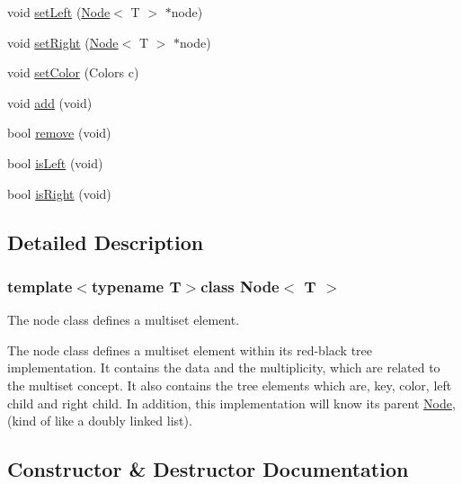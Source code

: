 \begin{DoxyCompactItemize}
\item 
void \hyperlink{class_node_a9afbeb2daea8798e71e9acc0967256a3}{set\+Left} (\hyperlink{class_node}{Node}$<$ T $>$ $\ast$node)
\item 
void \hyperlink{class_node_a1cf0e5397a347fee789c4b57dfb7624a}{set\+Right} (\hyperlink{class_node}{Node}$<$ T $>$ $\ast$node)
\item 
void \hyperlink{class_node_a96c1038d58f6f7089271afe3fa3e9288}{set\+Color} (Colors c)
\item 
void \hyperlink{class_node_aef85f7c8d30881449f35ac5fda836438}{add} (void)
\item 
bool \hyperlink{class_node_a2f77a48dceae8b8268826483f9671e1a}{remove} (void)
\item 
bool \hyperlink{class_node_a614f99e8df6aebb91c9e17e204a8c170}{is\+Left} (void)
\item 
bool \hyperlink{class_node_ac8eeb9f7717618589d939491d87a04bf}{is\+Right} (void)
\end{DoxyCompactItemize}


\subsection{Detailed Description}
\subsubsection*{template$<$typename T$>$class Node$<$ T $>$}

The node class defines a multiset element.

The node class defines a multiset element within it\textquotesingle{}s red-\/black tree implementation. It contains the data and the multiplicity, which are related to the multiset concept. It also contains the tree elements which are, key, color, left child and right child. In addition, this implementation will know it\textquotesingle{}s parent \hyperlink{class_node}{Node}, (kind of like a doubly linked list). 

\subsection{Constructor \& Destructor Documentation}
\hypertarget{class_node_a40d6e9db35a69683afc2a960f96c1109}{}

